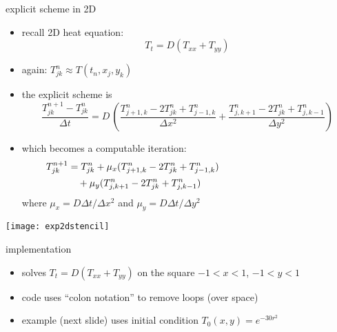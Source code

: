 \begin{frame}{explicit scheme in 2D}

\begin{itemize}
\item recall 2D heat equation:
    $$T_t = D(T_{xx} + T_{yy})$$
\item again: $T_{jk}^n \approx T(t_n,x_j,y_k)$
\item the explicit scheme is
\small
	$$\frac{T_{jk}^{n+1} - T_{jk}^n}{\Delta t} = D\,\left(\frac{T_{j+1,k}^n - 2 T_{jk}^n + T_{j-1,k}^n}{\Delta x^2} + \frac{T_{j,k+1}^n - 2 T_{jk}^n + T_{j,k-1}^n}{\Delta y^2}\right)$$
\normalsize
\item which becomes a computable iteration:
\small
\begin{align*}
T_{jk}^{n+1} &= T_{jk}^n + \mu_x (T_{j+1,k}^n - 2 T_{jk}^n + T_{j-1,k}^n) \hspace{40mm} \\
             &\quad + \mu_y (T_{j,k+1}^n - 2 T_{jk}^n + T_{j,k-1}^n)
\end{align*}
\normalsize
where $\mu_x=D\Delta t/\Delta x^2$ and $\mu_y = D\Delta t/\Delta y^2$
\end{itemize}

\vspace{-20mm}
\hfill \texttt{[image: exp2dstencil]}
\end{frame}


\begin{frame}{implementation}
\label{slide:heatmatlab}


\small
\begin{itemize}
\item solves $T_t = D(T_{xx} + T_{yy})$ on the square $-1 < x < 1$, $-1 < y < 1$
\item code uses ``colon notation'' to remove loops (over space)
\item example (next slide) uses initial condition $T_0(x,y) = e^{-30 r^2}$
\end{itemize}
\end{frame}


